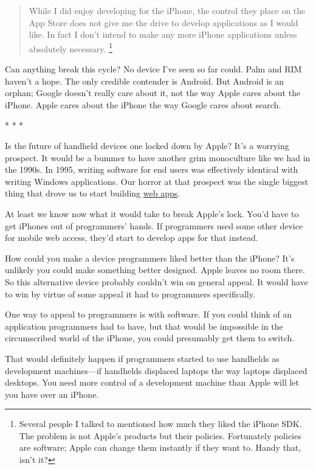 \documentclass[12pt]{book}
\begin{document}
\begin{quote}
While I did enjoy developing for the iPhone, the control they place on
the App Store does not give me the drive to develop applications as I
would like. In fact I don't intend to make any more iPhone applications
unless absolutely necessary. \footnote{Several people I talked to mentioned how much they liked the
iPhone SDK. The problem is not Apple's products but their policies.
Fortunately policies are software; Apple can change them instantly if
they want to. Handy that, isn't it?}
\end{quote}

Can anything break this cycle? No device I've seen so far could. Palm
and RIM haven't a hope. The only credible contender is Android. But
Android is an orphan; Google doesn't really care about it, not the way
Apple cares about the iPhone. Apple cares about the iPhone the way
Google cares about search.

* * *

Is the future of handheld devices one locked down by Apple? It's a
worrying prospect. It would be a bummer to have another grim monoculture
like we had in the 1990s. In 1995, writing software for end users was
effectively identical with writing Windows applications. Our horror at
that prospect was the single biggest thing that drove us to start
building \href{road.html}{web apps}.

At least we know now what it would take to break Apple's lock. You'd
have to get iPhones out of programmers' hands. If programmers used some
other device for mobile web access, they'd start to develop apps for
that instead.

How could you make a device programmers liked better than the iPhone?
It's unlikely you could make something better designed. Apple leaves no
room there. So this alternative device probably couldn't win on general
appeal. It would have to win by virtue of some appeal it had to
programmers specifically.

One way to appeal to programmers is with software. If you could think of
an application programmers had to have, but that would be impossible in
the circumscribed world of the iPhone, you could presumably get them to
switch.

That would definitely happen if programmers started to use handhelds as
development machines---if handhelds displaced laptops the way laptops
displaced desktops. You need more control of a development machine than
Apple will let you have over an iPhone.
\end{document}
